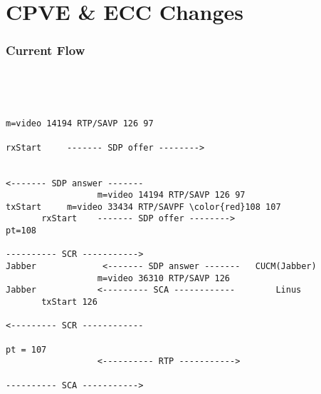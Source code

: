 \documentclass{beamer}
\begin{document}
\section{CPVE \& ECC Changes}
\begin{frame}[fragile]
  \frametitle{Current Flow}

\begin{center}
\begin{BVerbatim}[fontfamily=courier, fontsize=\relsize{-5}, commandchars=\\\{\}]



                                                                                        m=video 14194 RTP/SAVP 126 97           
                                                                            rxStart     ------- SDP offer -------->             
                                                                                                                  
                                                                                        <------- SDP answer -------      
                  m=video 14194 RTP/SAVP 126 97                             txStart     m=video 33434 RTP/SAVPF \color{red}108 107
       rxStart    ------- SDP offer -------->                                  pt=108                                                  
                                                                                        ---------- SCR ----------->        
Jabber             <------- SDP answer -------   CUCM(Jabber)                                                                   
                  m=video 36310 RTP/SAVP 126                          Jabber            <--------- SCA ------------        Linus
       txStart 126                                                                                                              
                                                                                        <--------- SCR ------------        
                                                                                                       pt = 107
                  <---------- RTP ----------->                                                                                  
                                                                                        ---------- SCA ----------->       
                                                                                                                                

\end{BVerbatim}
\end{center}
\end{frame}
\end{document}
